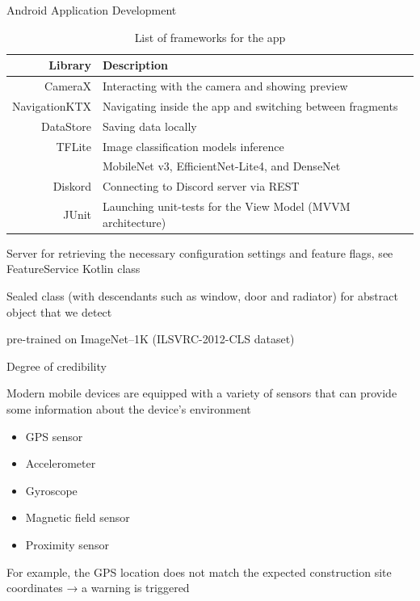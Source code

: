 \documentclass{beamer}%
\begin{document}
\begin{frame}{Android Application Development}
\begin{changemargin}
\footnotesize

\begin{table}[h]
\caption{List of frameworks for the app}
\centering\begin{tabular}{rl}
\toprule
Library   & Description                          \\
\midrule
CameraX  & Interacting with the camera and showing preview \\
NavigationKTX   & Navigating inside the app and switching between fragments                   \\
DataStore       & Saving data locally                   \\
TFLite       & Image classification models inference \\ & MobileNet v3, EfficientNet-Lite4, and DenseNet                  \\
Diskord     & Connecting to Discord server via REST  \\
JUnit       & Launching unit-tests for the View Model (MVVM architecture)                \\
\bottomrule
\end{tabular}
\label{table:libraries}
\end{table}

\vspace{1.5ex} Server for retrieving the necessary configuration settings and feature flags, see FeatureService Kotlin class

Sealed class (with descendants such as window, door and radiator) for abstract object that we detect

pre-trained on ImageNet--1K (ILSVRC-2012-CLS dataset)

\end{changemargin}
\end{frame}
\begin{frame}{Degree of credibility}
\begin{changemargin}
\footnotesize

Modern mobile devices are equipped with a variety of sensors that can provide some information about the device's environment
\begin{itemize}
    \item GPS sensor
    \item Accelerometer
    \item Gyroscope
    \item Magnetic field sensor
    \item Proximity sensor
\end{itemize}

 For example, the GPS location does not match the expected construction site coordinates → a warning is triggered
 
\end{changemargin}
\end{frame}
\end{document}
